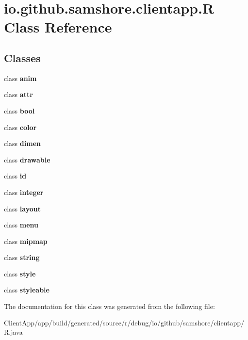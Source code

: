 \hypertarget{classio_1_1github_1_1samshore_1_1clientapp_1_1_r}{}\section{io.\+github.\+samshore.\+clientapp.\+R Class Reference}
\label{classio_1_1github_1_1samshore_1_1clientapp_1_1_r}
\subsection*{Classes}
\begin{DoxyCompactItemize}
\item 
class {\bfseries anim}
\item 
class {\bfseries attr}
\item 
class {\bfseries bool}
\item 
class {\bfseries color}
\item 
class {\bfseries dimen}
\item 
class {\bfseries drawable}
\item 
class {\bfseries id}
\item 
class {\bfseries integer}
\item 
class {\bfseries layout}
\item 
class {\bfseries menu}
\item 
class {\bfseries mipmap}
\item 
class {\bfseries string}
\item 
class {\bfseries style}
\item 
class {\bfseries styleable}
\end{DoxyCompactItemize}


The documentation for this class was generated from the following file\+:\begin{DoxyCompactItemize}
\item 
Client\+App/app/build/generated/source/r/debug/io/github/samshore/clientapp/R.\+java\end{DoxyCompactItemize}
